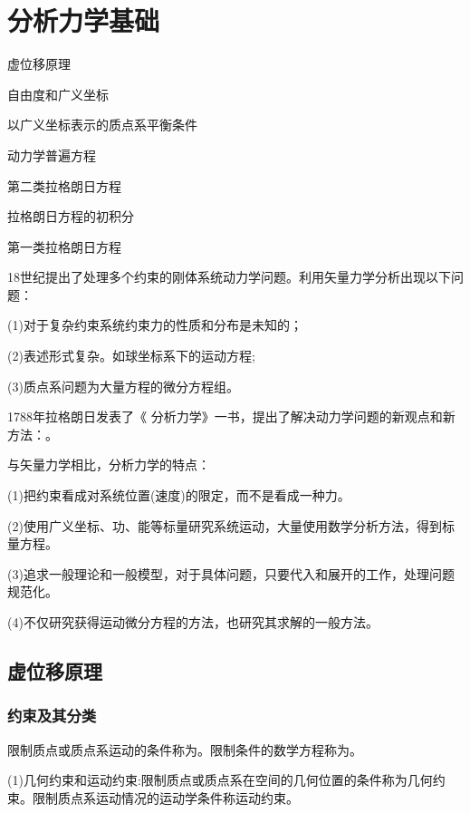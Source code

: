 \chapter{分析力学基础}

\begin{introduction}   
	\item 虚位移原理
	\item 自由度和广义坐标
	\item 以广义坐标表示的质点系平衡条件 
	\item 动力学普遍方程
	\item 第二类拉格朗日方程
	\item 拉格朗日方程的初积分 
	\item 第一类拉格朗日方程	
\end{introduction}

18世纪提出了处理多个约束的刚体系统动力学问题。利用矢量力学分析出现以下问题：

(1)对于复杂约束系统约束力的性质和分布是未知的；

(2)表述形式复杂。如球坐标系下的运动方程;

(3)质点系问题为大量方程的微分方程组。            

1788年拉格朗日发表了《 分析力学》一书，提出了解决动力学问题的新观点和新方法：。

与矢量力学相比，分析力学的特点：    

(1)把约束看成对系统位置(速度)的限定，而不是看成一种力。

(2)使用广义坐标、功、能等标量研究系统运动，大量使用数学分析方法，得到标量方程。

(3)追求一般理论和一般模型，对于具体问题，只要代入和展开的工作，处理问题规范化。

(4)不仅研究获得运动微分方程的方法，也研究其求解的一般方法。

\section{虚位移原理}

\subsection{约束及其分类}

限制质点或质点系运动的条件称为。限制条件的数学方程称为。

(1)几何约束和运动约束:限制质点或质点系在空间的几何位置的条件称为几何约束。限制质点系运动情况的运动学条件称运动约束。

